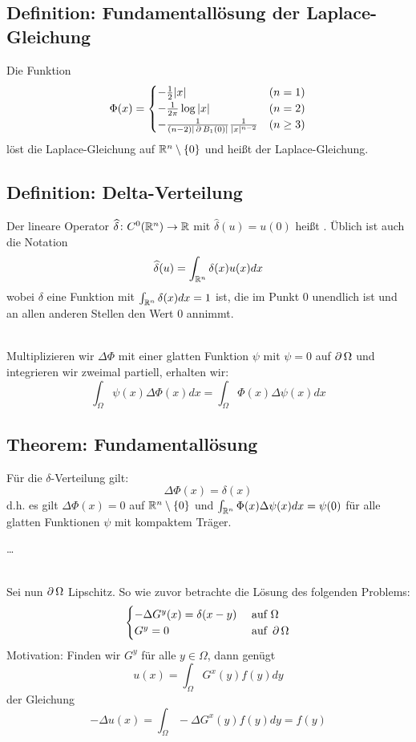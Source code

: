 \subsection{Definition: Fundamentallösung der Laplace-Gleichung}
\label{def:fundamentallsg_laplace} \label{def_44}
	Die Funktion \marginnote{[44]}
	\[ \Phi(x) = \begin{cases}
		-\frac{1}{2}|x| & (n=1) \\
		-\frac{1}{2\pi} \log |x| & (n=2) \\
		-\frac{1}{(n-2)|\operatorname{\partial} B_1(0)|}\frac{1}{|x|^{n-2}} & (n \geq 3) \end{cases} \]
	löst die Laplace-Gleichung auf $\mathbb{R}^n \setminus \{0\}$ und heißt  der Laplace-Gleichung.
	
\subsection{Definition: Delta-Verteilung}
\label{def:delta_vert} \label{def_45}
	Der lineare Operator $\widehat{\delta}\colon C^0(\mathbb{R}^n) \rightarrow \mathbb{R}$ mit $\widehat{\delta}(u) = u(0)$ heißt . Üblich ist auch die Notation \marginnote{[45]}
	\[ \widehat{\delta}(u) = \int_{\mathbb{R}^n} \delta(x) u(x) dx \]
	wobei $\delta$ eine Funktion mit $\int_{\mathbb{R}^n} \delta(x) dx = 1$ ist, die im Punkt 0 unendlich ist und an allen anderen Stellen den Wert 0 annimmt.
	
\mbox{} \\
Multiplizieren wir $\Delta \Phi$ mit einer glatten Funktion $\psi$ mit $\psi = 0$ auf $\operatorname{\partial} \Omega$ und integrieren wir zweimal partiell, erhalten wir:
\[ \int_{\Omega} \psi(x) \Delta \Phi(x) dx = \int_{\Omega} \Phi(x) \Delta \psi(x) dx \]

\subsection{Theorem: Fundamentallösung}
\label{thm_46} \label{fundamentallsg}
	Für die $\delta$-Verteilung gilt: \marginnote{[46]}
	\[ \Delta \Phi(x) = \delta(x) \]
	d.h. es gilt $\Delta \Phi(x) = 0$ auf $\mathbb{R}^n \setminus \{0\}$ und $\int_{\mathbb{R}^n} \Phi(x) \Delta \psi(x) dx = \psi(0)$ für alle glatten Funktionen $\psi$ mit kompaktem Träger.
	
	\dots
	
\mbox{} \\	
Sei nun $\operatorname{\partial} \Omega$ Lipschitz. So wie zuvor betrachte die Lösung des folgenden Problems:
\begin{equation}
	\begin{cases}
		- \Delta G^y(x) = \delta(x-y) & \text{ auf } \Omega \\
		G^y = 0 & \text{ auf } \operatorname{\partial} \Omega \label{eq_25}
	\end{cases}
\end{equation}
Motivation: Finden wir $G^y$ für alle $y \in \Omega$, dann genügt
\begin{equation}
	u(x) = \int_{\Omega} G^x(y) f(y) dy \label{eq_26}
\end{equation}
der Gleichung
\begin{equation}
	-\Delta u(x) = \int_{\Omega} -\Delta G^x(y) f(y) dy = f(y)
\end{equation}

